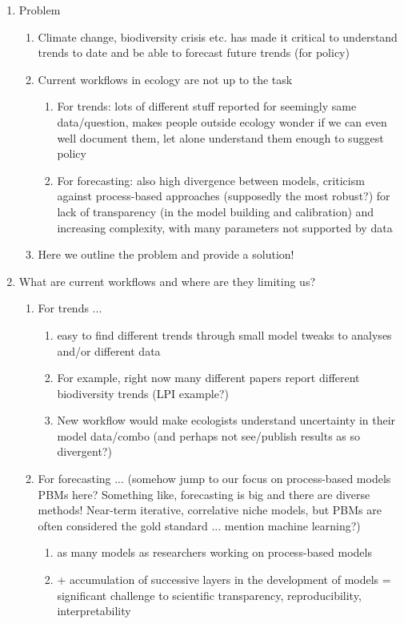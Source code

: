 \documentclass[11pt]{article}
\begin{document}
\begin{enumerate}
\item Problem
\begin{enumerate}
\item Climate change, biodiversity crisis etc. has made it critical to understand trends to date and be able to forecast future trends (for policy)
\item Current workflows in ecology are not up to the task
\begin{enumerate}
\item For trends: lots of different stuff reported for seemingly same data/question, makes people outside ecology wonder if we can even well document them, let alone understand them enough to suggest policy
\item For forecasting: also high divergence between models, criticism against process-based approaches (supposedly the most robust?) for lack of transparency (in the model building and calibration) and increasing complexity, with many parameters not supported by data
\end{enumerate}
\item Here we outline the problem and provide a solution!
\end{enumerate}
\item What are current workflows and where are they limiting us?
\begin{enumerate}
\item For trends ...
\begin{enumerate}
\item easy to find different trends through small model tweaks to analyses and/or different data
\item For example, right now many different papers report different biodiversity trends (LPI example?)
\item New workflow would make ecologists understand uncertainty in their model data/combo (and perhaps not see/publish results as so divergent?)
\end{enumerate}
\item For forecasting ... (somehow jump to our focus on process-based models PBMs here? Something like, forecasting is big and there are diverse methods! Near-term iterative, correlative niche models, but PBMs are often considered the gold standard ... mention machine learning?)
\begin{enumerate}
\item as many models as researchers working on process-based models 
\item + accumulation of successive layers in the development of models = significant challenge to scientific transparency, reproducibility, interpretability\\

\end{enumerate}
\end{enumerate}
\end{enumerate}
\end{document}
